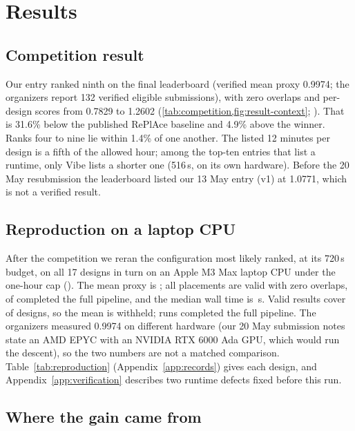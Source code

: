 \section{Results}\label{sec:results}

\subsection{Competition result}\label{sec:competition}

Our entry ranked ninth on the final leaderboard (verified mean proxy 0.9974; the
organizers report 132 verified eligible submissions), with zero overlaps and
per-design scores from 0.7829 to 1.2602 (\cref{tab:competition,fig:result-context};
\official). That is 31.6\% below the published RePlAce baseline
\citep{cheng2025updated} and 4.9\% above the winner. Ranks four to nine lie within
1.4\% of one another. The listed 12 minutes per design is a fifth of the allowed hour;
among the top-ten entries that list a runtime, only Vibe lists a shorter one (516\,s,
on its own hardware). Before the 20 May resubmission the leaderboard listed our 13 May
entry (v1) at 1.0771, which is not a verified result.



\subsection{Reproduction on a laptop CPU}\label{sec:reproduction}

After the competition we reran the configuration most likely ranked, at its 720\,s
budget, on all 17 designs in turn on an Apple M3 Max laptop CPU under the one-hour cap
(\reproduction). \ifReproComplete The mean proxy is \ReproMean{}; all \ReproValid{}
placements are valid with zero overlaps, \ReproCompleted{} of \ReproDesigns{}
completed the full pipeline, and the median wall time is \ReproWallMedian\,s.\else
Valid results cover \ReproValid{} of \ReproDesigns{} designs, so the mean is
withheld; \ReproCompleted{} runs completed the full pipeline.\fi{} The organizers
measured 0.9974 on different hardware (our 20 May submission notes state an AMD EPYC
with an NVIDIA RTX 6000 Ada GPU, which would run the descent), so the two numbers are
not a matched comparison. Table~\ref{tab:reproduction} (Appendix~\ref{app:records})
gives each design, and Appendix~\ref{app:verification} describes two runtime defects
fixed before this run.

\subsection{Where the gain came from}\label{sec:gain}

